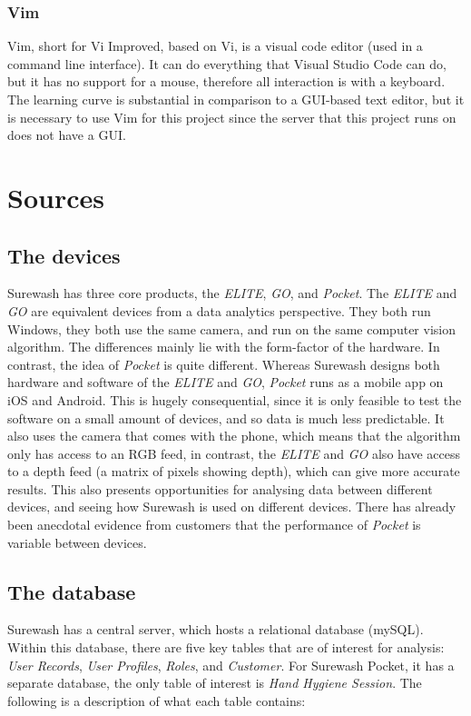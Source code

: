         \subsubsection{Vim}
        Vim, short for Vi Improved, based on Vi, is a visual code editor (used in a command line interface). It can do everything that Visual Studio Code can do, but it has no support for a mouse, therefore all interaction is with a keyboard. The learning curve is substantial in comparison to a GUI-based text editor, but it is necessary to use Vim for this project since the server that this project runs on does not have a GUI.


\section{Sources}
    \subsection{The devices} Surewash has three core products, the {\slshape ELITE}, {\slshape GO}, and {\slshape Pocket}. The {\slshape ELITE} and {\slshape GO} are equivalent devices from a data analytics perspective. They both run Windows, they both use the same camera, and run on the same computer vision algorithm. The differences mainly lie with the form-factor of the hardware. In contrast, the idea of {\slshape Pocket} is quite different. Whereas Surewash designs both hardware and software of the {\slshape ELITE} and {\slshape GO}, {\slshape Pocket} runs as a mobile app on iOS and Android. This is hugely consequential, since it is only feasible to test the software on a small amount of devices, and so data is much less predictable. It also uses the camera that comes with the phone, which means that the algorithm only has access to an RGB feed, in contrast, the {\slshape ELITE} and {\slshape GO} also have access to a depth feed (a matrix of pixels showing depth), which can give more accurate results. This also presents opportunities for analysing data between different devices, and seeing how Surewash is used on different devices. There has already been anecdotal evidence from customers that the performance of {\slshape Pocket} is variable between devices.
    \subsection{The database}
    Surewash has a central server, which hosts a relational database (mySQL). Within this database, there are five key tables that are of interest for analysis: {\slshape User Records}, {\slshape User Profiles}, {\slshape Roles}, and {\slshape Customer}. For Surewash Pocket, it has a separate database, the only table of interest is {\slshape Hand Hygiene Session}. The following is a description of what each table contains:
